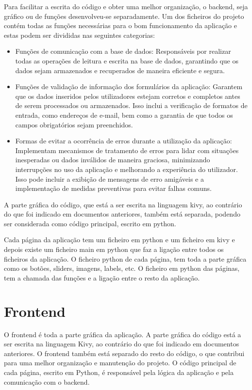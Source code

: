 \documentclass[a4paper,12pt]{report}
\begin{document}
	Para facilitar a escrita do código e obter uma melhor organização, o backend, seja gráfico ou de funções desenvolveu-se separadamente. Um dos ficheiros do projeto contém todas as funções necessárias para o bom funcionamento da aplicação e estas podem ser divididas nas seguintes categorias:
	
	\begin{itemize}
		 \item Funções de comunicação com a base de dados: Responsáveis por realizar todas as operações de leitura e escrita na base de dados, garantindo que os dados sejam armazenados e recuperados de maneira eficiente e segura.
		
		\item Funções de validação de informação dos formulários da aplicação: Garantem que os dados inseridos pelos utilizadores estejam corretos e completos antes de serem processados ou armazenados. Isso inclui a verificação de formatos de entrada, como endereços de e-mail, bem como a garantia de que todos os campos obrigatórios sejam preenchidos.
		
		\item Formas de evitar a ocorrência de erros durante a utilização da aplicação: Implementam mecanismos de tratamento de erros para lidar com situações inesperadas ou dados inválidos de maneira graciosa, minimizando interrupções no uso da aplicação e melhorando a experiência do utilizador. Isso pode incluir a exibição de mensagens de erro amigáveis e a implementação de medidas preventivas para evitar falhas comuns. 
	\end{itemize}
	
	A parte gráfica do código, que está a ser escrita na linguagem kivy, ao contrário do que foi indicado em documentos anteriores, também está separada, podendo ser considerada como código principal, escrito em python. 
	
	Cada página da aplicação tem um ficheiro em python e um
	ficheiro em kivy e depois existe um ficheiro main em python que faz a ligação entre todos os ficheiros da aplicação. O ficheiro python de cada página, tem toda a parte gráfica como os botões, sliders, imagens, labels, etc. O ficheiro em python das páginas, tem a chamada das funções e a ligação entre o resto da aplicação.
	
	\section{Frontend}
	
	 O frontend é toda a parte gráfica da aplicação. A parte gráfica do código está a ser escrita na linguagem Kivy, ao contrário do que foi indicado em documentos anteriores. O frontend também está separado do resto do código, o que contribui para uma melhor organização e manutenção do projeto. O código principal de cada página, escrito em Python, é responsável pela lógica da aplicação e pela comunicação com o backend.
	
\end{document}
